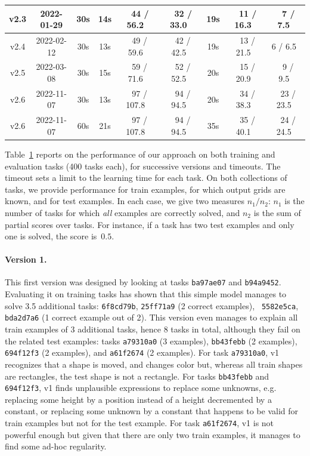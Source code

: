 \documentclass[a4paper]{llncs}
\begin{document}
\begin{table}[t]
\begin{tabular}{|c|c|c|c|c|c|c|c|c|}
    \hline
    v2.3 & 2022-01-29 & 30s & 14s & ~44 / 56.2~ & ~32 / 33.0~ & 19s & ~11 / 16.3~ & ~7 / 7.5~ \\
    \hline
    v2.4 & 2022-02-12 & 30s & 13s & ~49 / 59.6~ & ~42 / 42.5~ & 19s & ~13 / 21.5~ & 6 / 6.5~ \\ %
    \hline
    v2.5 & 2022-03-08 & 30s & 15s & ~59 / 71.6~ & ~52 / 52.5~ & 20s & ~15 / 20.9~ & ~9 / 9.5~ \\
    \hline
    v2.6 & 2022-11-07 & 30s & 13s & ~97 / 107.8~ & ~94 / 94.5~ & 20s & ~34 / 38.3~ & ~23 / 23.5~ \\
    v2.6 & 2022-11-07 & 60s & 21s & ~97 / 107.8~ & ~94 / 94.5~ &  35s & ~35 / 40.1~ & ~24 / 24.5~ \\
    \hline
  \end{tabular}
  \label{tab:eval}
\end{table}

Table~\ref{tab:eval} reports on the performance of our approach on
both training and evaluation tasks (400 tasks each), for successive
versions and timeouts. The timeout sets a limit to the learning time
for each task. On both collections of tasks, we provide performance
for train examples, for which output grids are known, and for test
examples. In each case, we give two measures $n_1/n_2$: $n_1$ is the
number of tasks for which {\em all} examples are correctly solved, and
$n_2$ is the sum of partial scores over tasks. For instance, if a task
has two test examples and only one is solved, the score is~$0.5$.

\paragraph{Version 1.} This first version was designed by looking at
tasks {\tt ba97ae07} and {\tt b94a9452}. Evaluating it on training
tasks has shown that this simple model manages to solve 3.5 additional
tasks: {\tt 6f8cd79b}, {\tt 25ff71a9} (2 correct examples), {\tt
  5582e5ca}, {\tt bda2d7a6} (1 correct example out of 2). This version
even manages to explain all train examples of 3 additional tasks,
hence 8 tasks in total, although they fail on the related test
examples: tasks {\tt a79310a0} (3 examples), {\tt bb43febb} (2
examples), {\tt 694f12f3} (2 examples), and {\tt a61f2674} (2
examples). For task {\tt a79310a0}, v1 recognizes that a shape is
moved, and changes color but, whereas all train shapes are rectangles,
the test shape is not a rectangle. For tasks {\tt bb43febb} and {\tt
  694f12f3}, v1 finds unplausible expressions to replace some
unknowns, e.g. replacing some height by a position instead of a height
decremented by a constant, or replacing some unknown by a constant
that happens to be valid for train examples but not for the test
example. For task {\tt a61f2674}, v1 is not powerful enough but given
that there are only two train examples, it manages to find some ad-hoc
regularity.
\end{document}

